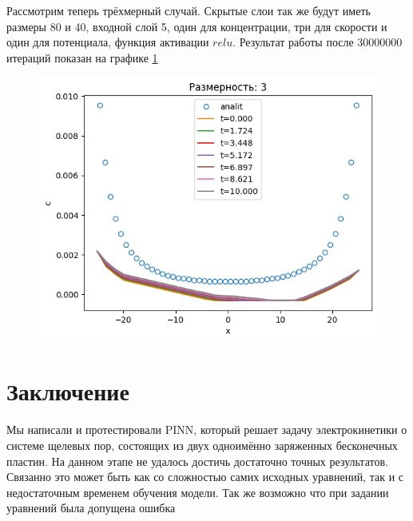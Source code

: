 \documentclass[a4paper,14pt]{extarticle} %
\begin{document}
Рассмотрим теперь трёхмерный случай. Скрытые слои так же будут иметь размеры 80 и 40, входной слой 5, один для концентрации, три для скорости и один для потенциала, функция активации $relu$. Результат работы после 30000000 итераций показан на графике \ref{fig:3dres}

\begin{figure}[ht]
    \includegraphics[scale=0.5]{../plots/3dim relu 80 20 30000000.png}
    \caption{}
    \label{fig:3dres}
\end{figure}

\newpage
\newpage

\section{Заключение}

Мы написали и протестировали PINN, который решает задачу электрокинетики о системе щелевых пор, состоящих из двух одноимённо заряженных бесконечных пластин. На данном этапе не удалось достичь достаточно точных результатов. Связанно это может быть как со сложностью самих исходных уравнений, так и с недостаточным временем обучения модели. Так же возможно что при задании уравнений была допущена ошибка

\newpage



\end{document}
